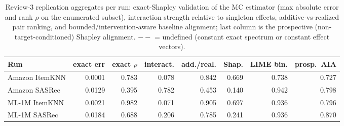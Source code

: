 \begin{table}[t]\centering\scriptsize\setlength{\tabcolsep}{2.5pt}
\caption{Review-3 replication aggregates per run: exact-Shapley validation of the
MC estimator (max absolute error and rank $\rho$ on the enumerated subset),
interaction strength relative to singleton effects, additive-vs-realized pair
ranking, and bounded/intervention-aware baseline alignment; last column is the
prospective (non-target-conditioned) Shapley alignment. $--$ = undefined
(constant exact spectrum or constant effect vectors).}
\label{tab:review3}
\begin{tabular}{@{}lrrrrrrr@{}}
\toprule
Run & exact err & exact $\rho$ & interact. & add./real. & Shap. & LIME bin. & prosp.\ AIA \\
\midrule
Amazon ItemKNN & 0.0001 & 0.783 & 0.078 & 0.842 & 0.669 & 0.738 & 0.727 \\
Amazon SASRec & 0.0129 & 0.395 & 0.782 & 0.453 & 0.140 & 0.942 & 0.798 \\
ML-1M ItemKNN & 0.0021 & 0.982 & 0.071 & 0.905 & 0.697 & 0.936 & 0.796 \\
ML-1M SASRec & 0.0184 & 0.688 & 0.206 & 0.785 & 0.241 & 0.936 & 0.870 \\
\bottomrule
\end{tabular}
\end{table}
